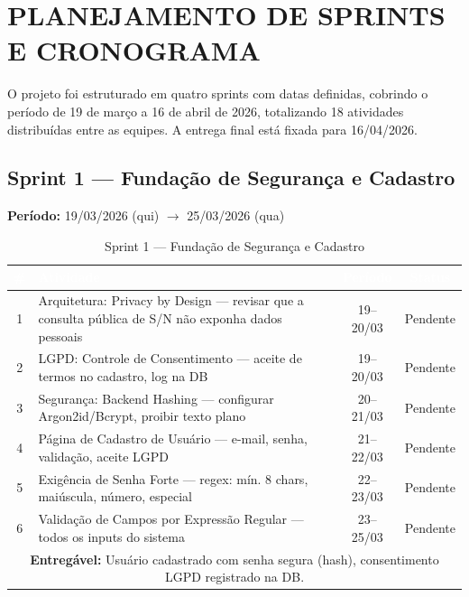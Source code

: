\documentclass[12pt,a4paper]{article}
\begin{document}
\section{PLANEJAMENTO DE SPRINTS E CRONOGRAMA}

O projeto foi estruturado em quatro sprints com datas definidas, cobrindo o período de
19 de março a 16 de abril de 2026, totalizando 18 atividades distribuídas entre as
equipes. A entrega final está fixada para 16/04/2026.

\subsection{Sprint 1 — Fundação de Segurança e Cadastro}
\textbf{Período:} 19/03/2026 (qui) $\rightarrow$ 25/03/2026 (qua)

\begin{table}[H]
  \centering
  \caption{Sprint 1 — Fundação de Segurança e Cadastro}
  \label{tab:sprint1}
  \renewcommand{\arraystretch}{1.3}
  \small
  \begin{tabularx}{\textwidth}{|c|X|c|c|}
    \hline
    \rowcolor{cinzaHeader}
    \textcolor{white}{\textbf{\#}} &
    \textcolor{white}{\textbf{Atividade}} &
    \textcolor{white}{\textbf{Período}} &
    \textcolor{white}{\textbf{Status}} \\
    \hline
    \rowcolor{amarelo}
    1 & Arquitetura: Privacy by Design — revisar que a consulta pública de S/N não exponha dados pessoais & 19--20/03 & Pendente \\
    \hline
    \rowcolor{amarelo}
    2 & LGPD: Controle de Consentimento — aceite de termos no cadastro, log na DB & 19--20/03 & Pendente \\
    \hline
    \rowcolor{amarelo}
    3 & Segurança: Backend Hashing — configurar Argon2id/Bcrypt, proibir texto plano & 20--21/03 & Pendente \\
    \hline
    \rowcolor{amarelo}
    4 & Página de Cadastro de Usuário — e-mail, senha, validação, aceite LGPD & 21--22/03 & Pendente \\
    \hline
    \rowcolor{amarelo}
    5 & Exigência de Senha Forte — regex: mín. 8 chars, maiúscula, número, especial & 22--23/03 & Pendente \\
    \hline
    \rowcolor{amarelo}
    6 & Validação de Campos por Expressão Regular — todos os inputs do sistema & 23--25/03 & Pendente \\
    \hline
    \multicolumn{4}{|p{\dimexpr\textwidth-2\tabcolsep-2\arrayrulewidth}|}{%
      \textbf{Entregável:} Usuário cadastrado com senha segura (hash), consentimento LGPD registrado na DB.} \\
    \hline
  \end{tabularx}
\end{table}
\end{document}
